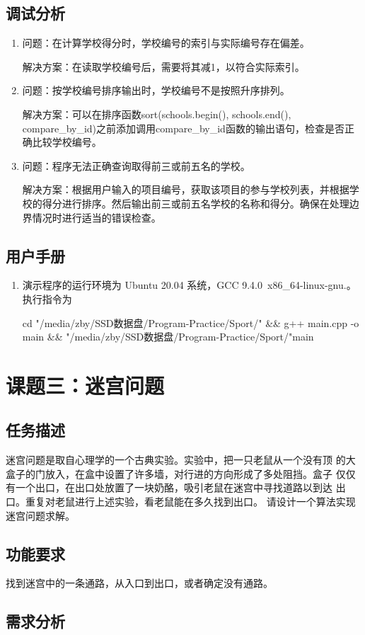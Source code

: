 \documentclass[UTF8,titlepage]{ctexart}
\numberwithin{figure}{section}
\begin{document}
\subsection{调试分析}
\begin{enumerate}
    \item 问题：在计算学校得分时，学校编号的索引与实际编号存在偏差。
    
          解决方案：在读取学校编号后，需要将其减1，以符合实际索引。
    

          \item 问题：按学校编号排序输出时，学校编号不是按照升序排列。
    
          解决方案：可以在排序函数sort(schools.begin(), schools.end(), compare\_by\_id)之前添加调用compare\_by\_id函数的输出语句，检查是否正确比较学校编号。
    \item 问题：程序无法正确查询取得前三或前五名的学校。
    
          解决方案：根据用户输入的项目编号，获取该项目的参与学校列表，并根据学校的得分进行排序。然后输出前三或前五名学校的名称和得分。确保在处理边界情况时进行适当的错误检查。

\end{enumerate}

\subsection{用户手册}
\begin{enumerate}
    \item 演示程序的运行环境为 Ubuntu 20.04 系统，GCC 9.4.0\ x86\_64-linux-gnu.。执行指令为
    
    cd "/media/zby/SSD数据盘/Program-Practice/Sport/" \&\& g++ main.cpp -o main \&\& "/media/zby/SSD数据盘/Program-Practice/Sport/"main


\end{enumerate}

\section{课题三：迷宫问题}

\subsection{任务描述}
迷宫问题是取自心理学的一个古典实验。实验中，把一只老鼠从一个没有顶
的大盒子的门放入，在盒中设置了许多墙，对行进的方向形成了多处阻挡。盒子
仅仅有一个出口，在出口处放置了一块奶酪，吸引老鼠在迷宫中寻找道路以到达
出口。重复对老鼠进行上述实验，看老鼠能在多久找到出口。
请设计一个算法实现迷宫问题求解。

\subsection{功能要求}

找到迷宫中的一条通路，从入口到出口，或者确定没有通路。

\subsection{需求分析}
\end{document}
